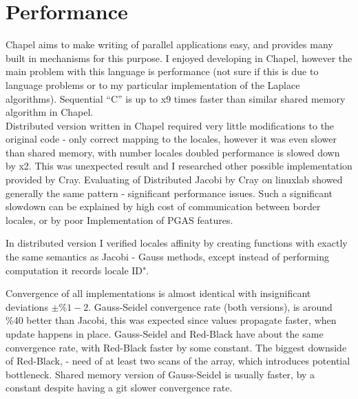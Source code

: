 \documentclass{article}
\begin{document}
\section{Performance}

Chapel aims to make writing of parallel applications easy, and provides many built in
mechanisms for this purpose. I enjoyed developing in Chapel, however the main problem with
this language is performance (not sure if this is due to language problems or to my
particular implementation of the Laplace algorithms). Sequential ``C'' is up to x9 times
faster than similar shared memory algorithm in Chapel. \\

Distributed version written in Chapel required very little modifications to the original
code - only correct mapping to the locales, however it was even slower than shared memory,
with number locales doubled performance is slowed down by x2. This was unexpected result and
I researched other possible implementation provided by Cray. Evaluating of Distributed
Jacobi by Cray on linuxlab showed generally the same pattern - significant performance
issues. Such a significant slowdown can be explained by high cost of communication between border
locales, or by poor Implementation of PGAS features.

In distributed version I verified locales affinity by creating functions with exactly the
same semantics as Jacobi - Gauss methods, except instead of performing computation it records
locale ID".


Convergence of all implementations is almost identical with insignificant deviations $\pm
\%1- 2$.
Gauss-Seidel convergence rate (both versions), is around \%40 better than Jacobi, this was
expected since values propagate faster, when update happens in place. Gauss-Seidel and Red-Black
have about the same convergence rate, with Red-Black faster by some constant. The biggest downside
of Red-Black, - need of at least two scans of the array, which introduces potential bottleneck.
Shared memory version of Gauss-Seidel is usually faster, by a constant despite having a git slower
convergence rate.

\end{document}
